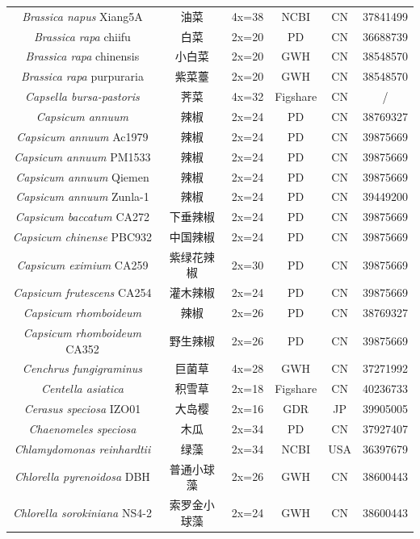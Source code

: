 {{\begin{longtable}{cccccc}
    \textit{Brassica napus} Xiang5A & 油菜 & 4x=38 & NCBI & CN & 37841499 \\
    \textit{Brassica rapa} chiifu & 白菜 & 2x=20 & PD & CN & 36688739 \\
    \textit{Brassica rapa} chinensis & 小白菜 & 2x=20 & GWH & CN & 38548570 \\
    \textit{Brassica rapa} purpuraria & 紫菜薹 & 2x=20 & GWH & CN & 38548570 \\
    \textit{Capsella bursa-pastoris} & 荠菜 & 4x=32 & Figshare & CN & / \\
    \textit{Capsicum annuum} & 辣椒 & 2x=24 & PD & CN & 38769327 \\
    \textit{Capsicum annuum} Ac1979 & 辣椒 & 2x=24 & PD & CN & 39875669 \\
    \textit{Capsicum annuum} PM1533 & 辣椒 & 2x=24 & PD & CN & 39875669 \\
    \textit{Capsicum annuum} Qiemen & 辣椒 & 2x=24 & PD & CN & 39875669 \\
    \textit{Capsicum annuum} Zunla-1 & 辣椒 & 2x=24 & PD & CN & 39449200 \\
    \textit{Capsicum baccatum} CA272 & 下垂辣椒 & 2x=24 & PD & CN & 39875669 \\
    \textit{Capsicum chinense} PBC932 & 中国辣椒 & 2x=24 & PD & CN & 39875669 \\
    \textit{Capsicum eximium} CA259 & 紫绿花辣椒 & 2x=30 & PD & CN & 39875669 \\
    \textit{Capsicum frutescens} CA254 & 灌木辣椒 & 2x=24 & PD & CN & 39875669 \\
    \textit{Capsicum rhomboideum} & 辣椒 & 2x=26 & PD & CN & 38769327 \\
    \textit{Capsicum rhomboideum} CA352 & 野生辣椒 & 2x=26 & PD & CN & 39875669 \\
    \textit{Cenchrus fungigraminus} & 巨菌草 & 4x=28 & GWH & CN & 37271992 \\
    \textit{Centella asiatica} & 积雪草 & 2x=18 & Figshare & CN & 40236733 \\
    \textit{Cerasus speciosa} IZO01 & 大岛樱 & 2x=16 & GDR & JP & 39905005 \\
    \textit{Chaenomeles speciosa} & 木瓜 & 2x=34 & PD & CN & 37927407 \\
    \textit{Chlamydomonas reinhardtii} & 绿藻 & 2x=34 & NCBI & USA & 36397679 \\
    \textit{Chlorella pyrenoidosa} DBH & 普通小球藻 & 2x=26 & GWH & CN & 38600443 \\
    \textit{Chlorella sorokiniana} NS4-2 & 索罗金小球藻 & 2x=24 & GWH & CN & 38600443 \\

\end{longtable}}}

